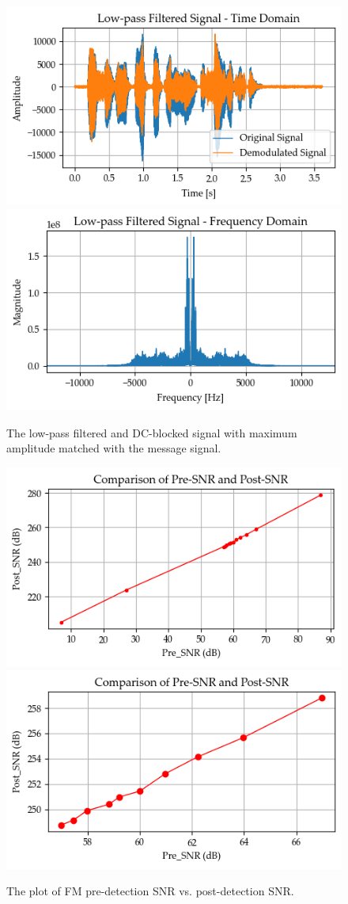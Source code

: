 \documentclass[../ECE459FinalProjectReport.tex]{subfiles}
\begin{document}
\begin{figure}[tb]
    \centering
    \includegraphics[width=0.49\linewidth]{plots/fm/lpf_signal_time.png}
    \includegraphics[width=0.49\linewidth]{plots/fm/lpf_signal_freq_smallFreq.png}
    \caption{The low-pass filtered and DC-blocked signal with maximum amplitude matched with the message signal.}
    \label{fig:fm-result}
\end{figure}

\begin{figure}[tb]
    \centering
    \includegraphics[width=0.49\linewidth]{plots/fm/snr1.png}
    \includegraphics[width=0.49\linewidth]{plots/fm/snr2.png}
    \caption{The plot of FM pre-detection SNR vs. post-detection SNR.}
    \label{fig:fm-snr-relation}
\end{figure}
\end{document}
